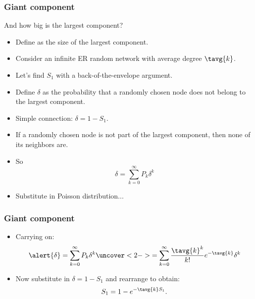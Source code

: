 \begin{frame}[label=]
  \frametitle{Giant component}
  
  \small
  \begin{block}{And how big is the largest component?}
    \begin{itemize}
    \item<1->
      Define  as the \alert{size of the largest component}.
    \item<2->
      Consider an infinite ER random network with average
      degree $\tavg{k}$.
    \item<3-> 
      Let's find $S_1$ with a back-of-the-envelope argument.
    \item<4-> 
      Define \alert{$\delta$} as the probability that a randomly
      chosen node \alert{does not} belong to the largest component.
    \item<5-> Simple connection: $\delta = 1 - S_1$.
    \item<6->
       If a randomly chosen node is not part
      of the largest component, then none of its neighbors are.
    \item<7->
      So
      $$
      \delta = \sum_{k=0}^\infty P_k \delta^k
      $$
    \item<8->
      Substitute in Poisson distribution...
    \end{itemize}
  \end{block}

\end{frame}

\begin{frame}[label=]
  \frametitle{Giant component}
  
  \begin{itemize}
  \item<1-> 
    Carrying on:
    $$ 
    \alert{\delta} = \sum_{k=0}^{\infty} P_k \delta^k 
    \uncover<2->{
      = \sum_{k=0}^{\infty} \frac{\tavg{k}^k}{k!} e^{-\tavg{k}} \delta^k 
    }
    $$
  \item<6->
    Now substitute in $\delta = 1 -S_1$ and rearrange
    to obtain:
    $$
    S_1 = 1 - e^{-\tavg{k}S_1}.
    $$
  \end{itemize}

\end{frame}


